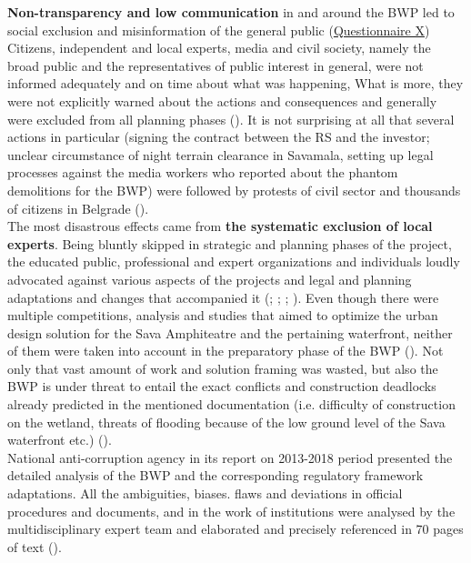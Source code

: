 \documentclass[11pt]{report}
\begin{document}
\textbf{Non-transparency and low communication} in and around the BWP led to social exclusion and misinformation of the general public
(\href{Questionnaire Experts Savamala}{Questionnaire X})
Citizens, independent and local experts, media and civil society, namely the broad public and the representatives of public interest in general, were not informed adequately and on time about what was happening,
What is more, they were not explicitly warned about the actions and consequences and generally were excluded from all planning phases
(\href{ref}{\citealt{ministarstvo_prostora_urbani_2014}}). 
It is not surprising at all that several actions in particular (signing the contract between the RS and the investor; unclear circumstance of night terrain clearance in Savamala, setting up legal processes against the media workers who reported about the phantom demolitions for the BWP) were followed by protests of civil sector and thousands of citizens in Belgrade (\cite{media, fb}).
\\

The most disastrous effects came from \textbf{the systematic exclusion of local experts}.
Being bluntly skipped in strategic and planning phases of the project, the educated public, professional and expert organizations and individuals loudly advocated against various aspects of the projects and legal and planning adaptations and changes that accompanied it 
(\href{ref}{\citealt{stojkov_crne_2015}}; \href{ref}{\citealt{stojkov_zaboravljene_2015}}; \href{ref}{\citealt{stojkov_sahrana_2015}}; \href{ref}{\citealt{stojkov_djindjuve_2015}}).
Even though there were multiple competitions, analysis and studies that aimed to optimize the urban design solution for the Sava Amphiteatre and the pertaining waterfront, neither of them were taken into account in the preparatory phase of the BWP (\cite{projects}).
Not only that vast amount of work and solution framing was wasted, but also the BWP is under threat to entail the exact conflicts and construction deadlocks already predicted in the mentioned documentation (i.e. difficulty of construction on the wetland, threats of flooding because of the low ground level of the Sava waterfront etc.) (\cite{projects}).
\\

National anti-corruption agency in its report on 2013-2018 period presented the detailed analysis of the BWP and the corresponding regulatory framework adaptations. All the ambiguities, biases. flaws and deviations in official procedures and documents, and in the work of institutions were analysed by the multidisciplinary expert team and elaborated and precisely referenced in 70 pages of text (\href{ref}{\citealt{pravni_skener_alternativni_2016}}).
\\
\end{document}
